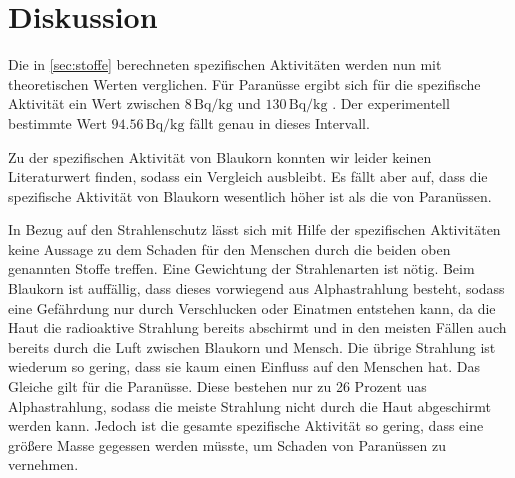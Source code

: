 \section{Diskussion}
\label{sec:Diskussion}

Die in \autoref{sec:stoffe} berechneten spezifischen Aktivitäten werden nun mit theoretischen Werten verglichen. Für Paranüsse ergibt sich für die spezifische 
Aktivität ein Wert zwischen $8\,\unit{\becquerel\per\kilo\gram}$ und $130\,\unit{\becquerel\per\kilo\gram}$ \cite{ap700}. Der experimentell bestimmte Wert 
$94.56\,\unit{\becquerel\per\kilo\gram}$ fällt genau in dieses Intervall.

Zu der spezifischen Aktivität von Blaukorn konnten wir leider keinen Literaturwert finden, sodass ein Vergleich ausbleibt. Es fällt aber auf, dass die 
spezifische Aktivität von Blaukorn wesentlich höher ist als die von Paranüssen. 

In Bezug auf den Strahlenschutz lässt sich mit Hilfe  der spezifischen Aktivitäten keine Aussage zu dem Schaden für den Menschen durch die beiden oben genannten 
Stoffe treffen. Eine Gewichtung der Strahlenarten ist nötig. Beim Blaukorn ist auffällig, dass dieses vorwiegend aus Alphastrahlung besteht, sodass eine 
Gefährdung nur durch Verschlucken oder Einatmen entstehen kann, da die Haut die radioaktive Strahlung bereits abschirmt und in den meisten Fällen auch bereits 
durch die Luft zwischen Blaukorn und Mensch. Die übrige Strahlung ist wiederum so gering, dass sie kaum einen Einfluss auf den Menschen hat. Das Gleiche 
gilt für die Paranüsse. Diese bestehen nur zu 26 Prozent uas Alphastrahlung, sodass die meiste Strahlung nicht durch die Haut abgeschirmt werden kann. 
Jedoch ist die gesamte spezifische Aktivität so gering, dass eine größere Masse gegessen werden müsste, um Schaden von Paranüssen zu vernehmen.